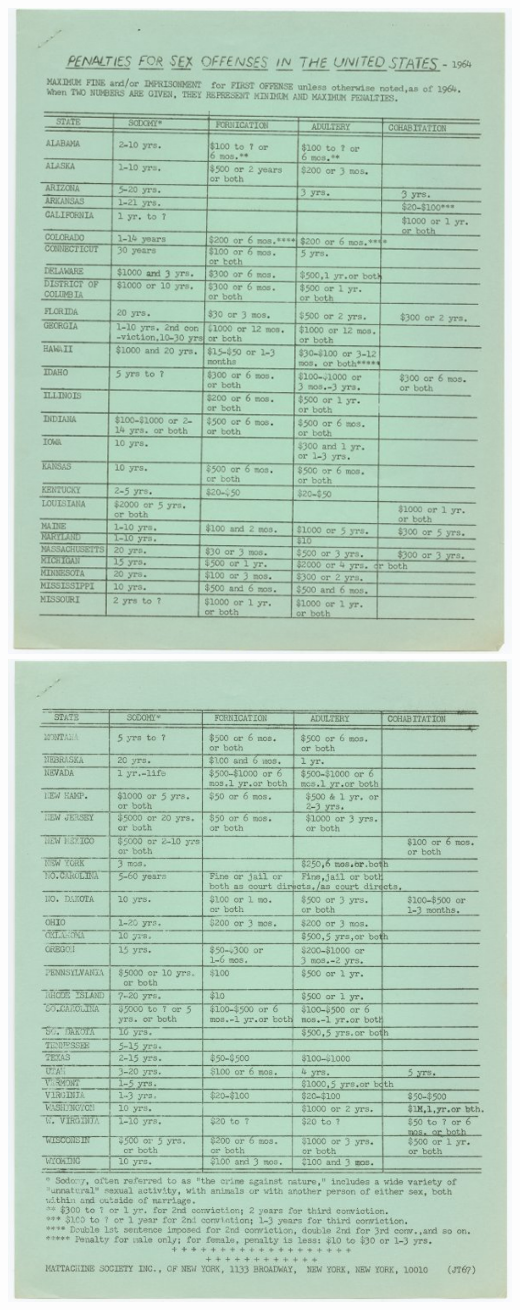 \begin{refsection}
\begin{marginfigure}
\begin{center}
     \includegraphics{../PrimarySourceMaterials/MattachineSocietyPamphlet1964-A.jpg}
\includegraphics{../PrimarySourceMaterials/MattachineSocietyPamphlet1964-B.jpg}

\end{center}
\end{marginfigure}
\end{refsection}
